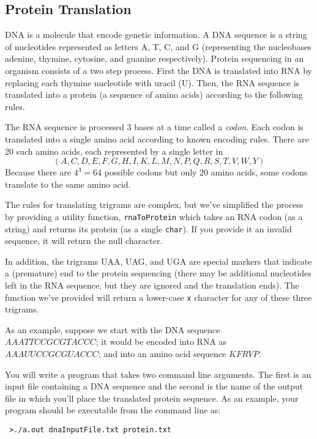 \documentclass[12pt]{scrartcl}
\begin{document}
\subsection*{Protein Translation}

DNA is a molecule that encode genetic information.  A DNA sequence is 
a string of nucleotides represented as letters A, T, C, and G (representing
the nucleobases adenine, thymine, cytosine, and guanine respectively).  
Protein sequencing in an organism consists of a two step process.  First 
the DNA is translated into RNA by replacing each thymine nucleotide with 
uracil (U).  Then, the RNA sequence is translated into a protein (a sequence
of amino acids) according to the following rules.

The RNA sequence is processed 3 bases at a time called a \emph{codon}.  
Each codon is translated into a single amino acid according to known 
encoding rules.  There are 20 such amino acids, each represented by a 
single letter in 
 $$(A,C,D,E,F,G,H,I,K,L,M,N,P,Q,R,S,T,V,W,Y)$$
Because there are $4^3 = 64$ possible codons but only 20 amino acids,
some codons translate to the same amino acid.

The rules for translating trigrams are complex, but we've simplified
the process by providing a utility function, \texttt{rnaToProtein}
which takes an RNA codon (as a string) and returns its protein (as a 
single \texttt{char}).  If you provide it an invalid sequence, it
will return \texttt{\0} the null character.

In addition, the trigrams UAA, UAG, and UGA are special markers that 
indicate a (premature) end to the protein sequencing (there may be 
additional nucleotides left in the RNA sequence, but they are ignored 
and the translation ends).  The function we've provided will
return a lower-case \texttt{x} character for any of these three 
trigrams.

As an example, suppose we start with the DNA sequence $AAATTCCGCGTACCC$; 
it would be encoded into RNA as $AAAUUCCGCGUACCC$; and into an amino 
acid sequence $KFRVP$.

You will write a program that takes two command line arguments.  The
first is an input file containing a DNA sequence and the second is the
name of the output file in which you'll place the translated protein
sequence.  As an example, your program should be executable from the 
command line as:

\texttt{~>./a.out dnaInputFile.txt protein.txt}
\end{document}
